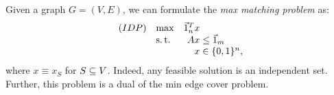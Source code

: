 \begin{defn}
    \label{def:max-ind-set-formulation}
    Given a graph $G=(V,E)$, we can formulate the \textit{max matching problem} as:
        \begin{equation*}
        \begin{array}{llr@{}l@{}}
            (IDP)   & \max  &   \one_n^T x  &               \\
                    & \st   &       Ax      &{}\le \one_m   \\
                    &       &       x       &{}\in \{0,1\}^n,
        \end{array}
        \end{equation*}
    where $x \equiv x_S$ for $S \subseteq V$. Indeed, any feasible solution is an independent set. Further, this problem is a dual of the min edge cover problem.
\end{defn}  